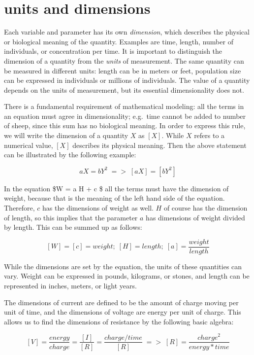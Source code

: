 \documentclass[
  letterpaper,
  DIV=11,
  numbers=noendperiod]{scrreprt}
\begin{document}
\hypertarget{units-and-dimensions}{%
\section*{units and dimensions}\label{units-and-dimensions}}

Each variable and parameter has its own \emph{dimension}, which
describes the physical or biological meaning of the quantity. Examples
are time, length, number of individuals, or concentration per time. It
is important to distinguish the dimension of a quantity from the
\emph{units} of measurement. The same quantity can be measured in
different units: length can be in meters or feet, population size can be
expressed in individuals or millions of individuals. The value of a
quantity depends on the units of measurement, but its essential
dimensionality does not.

There is a fundamental requirement of mathematical modeling: all the
terms in an equation must agree in dimensionality; e.g.~time cannot be
added to number of sheep, since this sum has no biological meaning. In
order to express this rule, we will write the dimension of a quantity
\(X\) as \([X]\). While \(X\) refers to a numerical value, \([X]\)
describes its physical meaning. Then the above statement can be
illustrated by the following example:

\[
aX = bY^2 \; => \; [aX] = [bY^2]
\]

In the equation \$W = a H + c \$ all the terms must have the dimension
of weight, because that is the meaning of the left hand side of the
equation. Therefore, \(c\) has the dimensions of weight as well. \(H\)
of course has the dimension of length, so this implies that the
parameter \(a\) has dimensions of weight divided by length. This can be
summed up as follows:

\[
[W] = [c] = weight ; \; [H] = length ; \; [a] = \frac{weight }{length}
\]

While the dimensions are set by the equation, the units of these
quantities can vary. Weight can be expressed in pounds, kilograms, or
stones, and length can be represented in inches, meters, or light years.

The dimensions of current are defined to be the amount of charge moving
per unit of time, and the dimensions of voltage are energy per unit of
charge. This allows us to find the dimensions of resistance by the
following basic algebra:

\[
[V] = \frac{energy}{charge} = \frac{[I]}{[R]} = \frac{charge/time}{[R]} \; => \; [R] = \frac{charge^2}{energy *time}
\]
\end{document}
